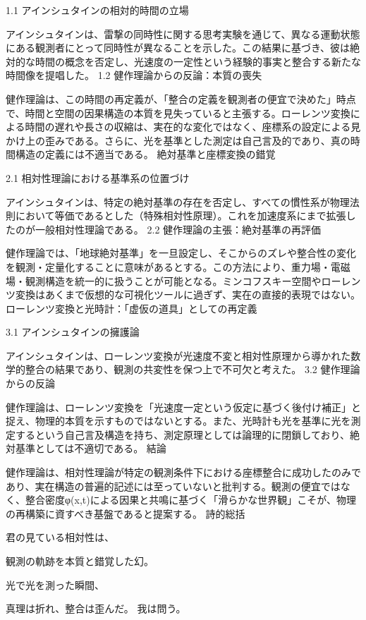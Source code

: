 \documentclass{article}
\begin{document}
1.1 アインシュタインの相対的時間の立場 

アインシュタインは、雷撃の同時性に関する思考実験を通じて、異なる運動状態にある観測者にとって同時性が異なることを示した。この結果に基づき、彼は絶対的な時間の概念を否定し、光速度の一定性という経験的事実と整合する新たな時間像を提唱した。 
1.2 健作理論からの反論：本質の喪失 

健作理論は、この時間の再定義が、「整合の定義を観測者の便宜で決めた」時点で、時間と空間の因果構造の本質を見失っていると主張する。ローレンツ変換による時間の遅れや長さの収縮は、実在的な変化ではなく、座標系の設定による見かけ上の歪みである。さらに、光を基準とした測定は自己言及的であり、真の時間構造の定義には不適当である。 
絶対基準と座標変換の錯覚 

2.1 相対性理論における基準系の位置づけ 

アインシュタインは、特定の絶対基準の存在を否定し、すべての慣性系が物理法則において等価であるとした（特殊相対性原理）。これを加速度系にまで拡張したのが一般相対性理論である。 
2.2 健作理論の主張：絶対基準の再評価 

健作理論では、「地球絶対基準」を一旦設定し、そこからのズレや整合性の変化を観測・定量化することに意味があるとする。この方法により、重力場・電磁場・観測構造を統一的に扱うことが可能となる。ミンコフスキー空間やローレンツ変換はあくまで仮想的な可視化ツールに過ぎず、実在の直接的表現ではない。 
ローレンツ変換と光時計：「虚仮の道具」としての再定義 

3.1 アインシュタインの擁護論 

アインシュタインは、ローレンツ変換が光速度不変と相対性原理から導かれた数学的整合の結果であり、観測の共変性を保つ上で不可欠と考えた。 
3.2 健作理論からの反論 

健作理論は、ローレンツ変換を「光速度一定という仮定に基づく後付け補正」と捉え、物理的本質を示すものではないとする。また、光時計も光を基準に光を測定するという自己言及構造を持ち、測定原理としては論理的に閉鎖しており、絶対基準としては不適切である。 
結論 

健作理論は、相対性理論が特定の観測条件下における座標整合に成功したのみであり、実在構造の普遍的記述には至っていないと批判する。観測の便宜ではなく、整合密度φ(x,t)による因果と共鳴に基づく「滑らかな世界観」こそが、物理の再構築に資すべき基盤であると提案する。 
詩的総括 

君の見ている相対性は、 

観測の軌跡を本質と錯覚した幻。 

光で光を測った瞬間、 

真理は折れ、整合は歪んだ。 
我は問う。 
\end{document}
